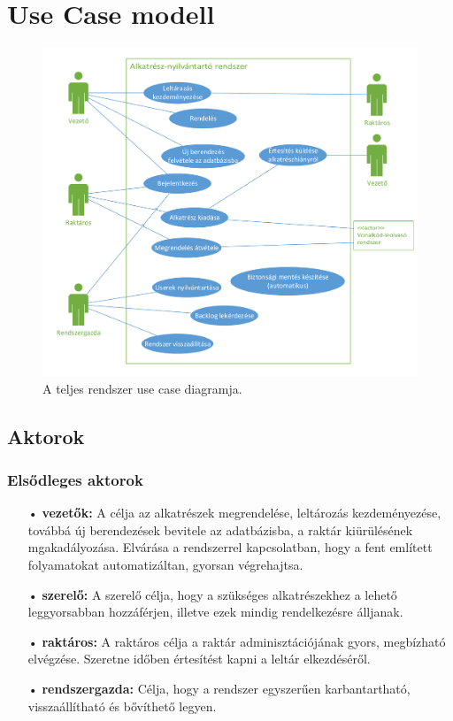 \documentclass[12pt]{article}\usepackage[left=20mm,right=20mm,top=15mm,bottom=20mm]{geometry}
\begin{document}
\section{Use Case modell}

\begin{figure}[!h]
    \centering
        \includegraphics[width=\textwidth]{kepek/use_case.pdf}
        \caption{A teljes rendszer use case diagramja.}
\end{figure}

\subsection{Aktorok}
\subsubsection{Elsődleges aktorok}
\begin{itemize}
\item[•] \textbf{vezetők: }  A célja az alkatrészek megrendelése, leltározás kezdeményezése, továbbá új berendezések bevitele az adatbázisba, a raktár kiürülésének mgakadályozása. Elvárása a rendszerrel kapcsolatban, hogy a fent említett folyamatokat automatizáltan, gyorsan végrehajtsa.
 
\item[•] \textbf{szerelő: } A szerelő célja, hogy a szükséges alkatrészekhez a lehető leggyorsabban hozzáférjen, illetve ezek mindig rendelkezésre álljanak.

\item[•] \textbf{raktáros: } A raktáros célja a raktár adminisztációjának gyors, megbízható elvégzése. 
Szeretne időben értesítést kapni a leltár elkezdéséről.

\item[•] \textbf{rendszergazda: } Célja, hogy a rendszer egyszerűen karbantartható, visszaállítható és bővíthető legyen.
\end{itemize}
\end{document}
